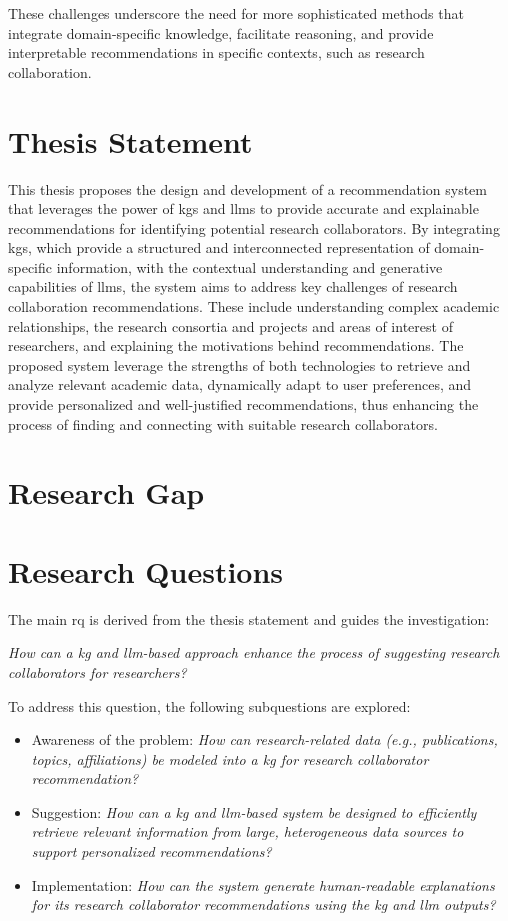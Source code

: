 These challenges underscore the need for more sophisticated methods that integrate domain-specific knowledge, facilitate reasoning, and provide interpretable recommendations in specific contexts, such as research collaboration.
%
\section{Thesis Statement}\label{sec:thesis-statement}

This thesis proposes the design and development of a recommendation system that leverages the power of \glspl{kg} and \glspl{llm} to provide accurate and explainable recommendations for identifying potential research collaborators.
By integrating \glspl{kg}, which provide a structured and interconnected representation of domain-specific information, with the contextual understanding and generative capabilities of \glspl{llm}, the system aims to address key challenges of research collaboration recommendations.
These include understanding complex academic relationships, the research consortia and projects and areas of interest of researchers, and explaining the motivations behind recommendations.
The proposed system leverage the strengths of both technologies to retrieve and analyze relevant academic data, dynamically adapt to user preferences, and provide personalized and well-justified recommendations, thus enhancing the process of finding and connecting with suitable research collaborators.
%
\section{Research Gap}\label{sec:research-gap}

%
\section{Research Questions}\label{sec:research-questions}
The main \gls{rq} is derived from the thesis statement and guides the investigation:

\textit{How can a \gls{kg} and \gls{llm}-based approach enhance the process of suggesting research collaborators for researchers?}

To address this question, the following subquestions are explored:
\begin{itemize}
	\item Awareness of the problem: \textit{How can research-related data (e.g., publications, topics, affiliations) be modeled into a \gls{kg} for research collaborator recommendation?}
	\item Suggestion: \textit{How can a \gls{kg} and \gls{llm}-based system be designed to efficiently retrieve relevant information from large, heterogeneous data sources to support personalized recommendations?}
	\item Implementation: \textit{How can the system generate human-readable explanations for its research collaborator recommendations using the \gls{kg} and \gls{llm} outputs?}
\end{itemize}

